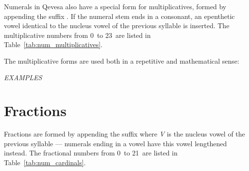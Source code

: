 \documentclass[grammar]{subfiles}
\begin{document}
  Numerals in Qevesa also have a special form for multiplicatives, formed by appending the suffix . If the numeral stem ends in a consonant, an epenthetic vowel identical to the nucleus vowel of the previous syllable is inserted. The multiplicative numbers from 0\dec\ to 23\dec\ are listed in Table~\ref{tab:num_multiplicatives}.

  \begin{table}[htpb]\small\capstart
      \qquad
      \caption{Multiplicative numerals from 0\dec\ to 23\dec\label{tab:num_multiplicatives}}
  \end{table}

  The multiplicative forms are used both in a repetitive and mathematical sense:

  \begin{exe}
    \ex \emph{EXAMPLES}
  \end{exe}

  \section{Fractions}
  \label{sec:num_fractions}

  Fractions are formed by appending the suffix  where \textit{V} is the nucleus vowel of the previous syllable — numerals ending in a vowel have this vowel lengthened instead. The fractional numbers from 0\dec\ to 21\dec\ are listed in Table~\ref{tab:num_cardinals}.
\end{document}
